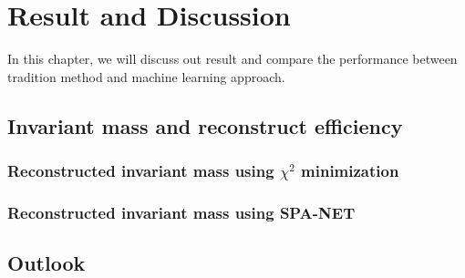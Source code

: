 \chapter{Result and Discussion} \label{Discussion}

In this chapter, we will discuss out result and compare the performance between tradition method and machine learning approach.

\section{Invariant mass and reconstruct efficiency }\label{sec:inv mass and reco eff}

\subsection{Reconstructed invariant mass using $\chi^{2}$ minimization}\label{subsec:reco inv mass chi2}

\subsection{Reconstructed invariant mass using SPA-NET}\label{subsec:reco inv mass spa-net}

\section{Outlook}\label{sec:outlook}



